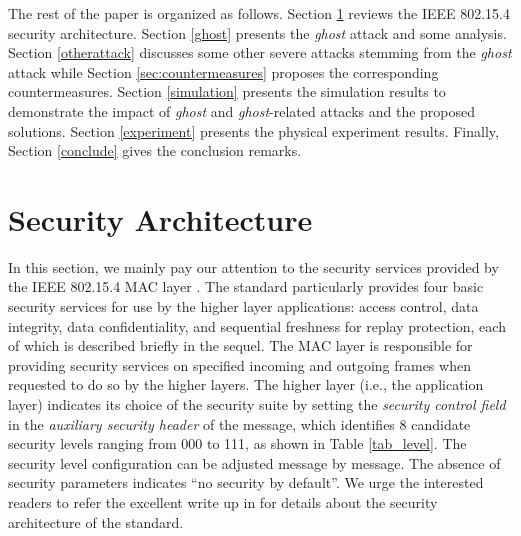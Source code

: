 \documentclass[10pt,journal,cspaper,compsoc]{IEEEtran}
\begin{document}
The rest of the paper is organized as follows. Section \ref{background} reviews the IEEE 802.15.4 security architecture. Section \ref{ghost} presents the {\em ghost} attack and some analysis. Section \ref{otherattack} discusses some other severe attacks stemming from the {\em ghost} attack while Section \ref{sec:countermeasures} proposes the corresponding countermeasures. Section \ref{simulation} presents the simulation results to demonstrate the impact of {\em ghost} and {\em ghost}-related attacks and the proposed solutions. Section \ref{experiment} presents the physical experiment results. Finally, Section \ref{conclude} gives the conclusion remarks.

\section{Security Architecture}\label{background}

In this section, we mainly pay our attention to the security services provided by the IEEE 802.15.4 MAC layer \cite{IEEE802.15.4}. The standard particularly provides four basic security services for use by the higher layer applications: access control, data integrity, data confidentiality, and sequential freshness for replay protection, each of which is described briefly in the sequel. The MAC layer is responsible for providing security services on specified incoming and outgoing frames when requested to do so by the higher layers. The higher layer (i.e., the application layer) indicates its choice of the security suite by setting the {\em security control field} in the {\em auxiliary security header} of the message, which identifies 8 candidate security levels ranging from 000 to 111, as shown in Table \ref{tab_level}. The security level configuration can be adjusted message by message. The absence of security parameters indicates ``no security by default''. We urge the interested readers to refer the excellent write up in \cite{Sastry} for details about the security architecture of the standard.
\end{document}
